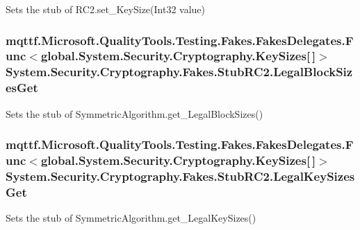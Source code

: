 Sets the stub of R\-C2.\-set\-\_\-\-Key\-Size(\-Int32 value)

\hypertarget{class_system_1_1_security_1_1_cryptography_1_1_fakes_1_1_stub_r_c2_a2c6a1058ade405c402e6e4df28d983c1}{
\subsubsection[{Legal\-Block\-Sizes\-Get}]{\setlength{\rightskip}{0pt plus 5cm}mqttf.\-Microsoft.\-Quality\-Tools.\-Testing.\-Fakes.\-Fakes\-Delegates.\-Func$<$global.\-System.\-Security.\-Cryptography.\-Key\-Sizes\mbox{[}$\,$\mbox{]}$>$ System.\-Security.\-Cryptography.\-Fakes.\-Stub\-R\-C2.\-Legal\-Block\-Sizes\-Get}}\label{class_system_1_1_security_1_1_cryptography_1_1_fakes_1_1_stub_r_c2_a2c6a1058ade405c402e6e4df28d983c1}


Sets the stub of Symmetric\-Algorithm.\-get\-\_\-\-Legal\-Block\-Sizes()

\hypertarget{class_system_1_1_security_1_1_cryptography_1_1_fakes_1_1_stub_r_c2_a7342ab654d3593d1519c829bb98c1755}{
\subsubsection[{Legal\-Key\-Sizes\-Get}]{\setlength{\rightskip}{0pt plus 5cm}mqttf.\-Microsoft.\-Quality\-Tools.\-Testing.\-Fakes.\-Fakes\-Delegates.\-Func$<$global.\-System.\-Security.\-Cryptography.\-Key\-Sizes\mbox{[}$\,$\mbox{]}$>$ System.\-Security.\-Cryptography.\-Fakes.\-Stub\-R\-C2.\-Legal\-Key\-Sizes\-Get}}\label{class_system_1_1_security_1_1_cryptography_1_1_fakes_1_1_stub_r_c2_a7342ab654d3593d1519c829bb98c1755}


Sets the stub of Symmetric\-Algorithm.\-get\-\_\-\-Legal\-Key\-Sizes()

